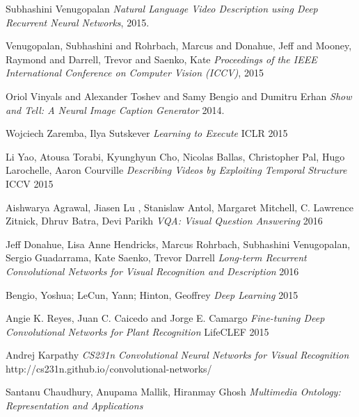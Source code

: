 \documentclass[11pt]{article}
\begin{document}
	\begin{thebibliography}{1}
	
	   Subhashini Venugopalan {\em Natural Language Video Description using Deep Recurrent Neural Networks}, 2015.
	
	    Venugopalan, Subhashini and Rohrbach, Marcus and Donahue, Jeff
                    and Mooney, Raymond and Darrell, Trevor and Saenko, Kate {\em Proceedings of the IEEE International Conference on Computer Vision (ICCV)}, 2015
	
	   Oriol Vinyals and
               Alexander Toshev and
               Samy Bengio and
               Dumitru Erhan {\em Show and Tell: {A} Neural Image Caption Generator} 2014.

         Wojciech Zaremba, Ilya Sutskever {\em Learning to Execute} ICLR 2015
         

           Li Yao, Atousa Torabi, Kyunghyun Cho, Nicolas Ballas, Christopher Pal, Hugo Larochelle, Aaron Courville {\em Describing Videos by Exploiting Temporal Structure} ICCV 2015
        

          Aishwarya Agrawal, Jiasen Lu , Stanislaw Antol,
		Margaret Mitchell, C. Lawrence Zitnick, Dhruv Batra, Devi Parikh {\em VQA: Visual Question Answering} 2016
        

          Jeff Donahue, Lisa Anne Hendricks, Marcus Rohrbach, Subhashini Venugopalan, Sergio Guadarrama, Kate Saenko, Trevor Darrell {\em Long-term Recurrent Convolutional Networks for Visual Recognition and Description} 2016

          Bengio, Yoshua; LeCun, Yann; Hinton, Geoffrey {\em Deep Learning} 2015

          Angie K. Reyes, Juan C. Caicedo and Jorge E. Camargo {\em Fine-tuning Deep Convolutional Networks for
		Plant Recognition} LifeCLEF 2015

          Andrej Karpathy {\em 
			CS231n Convolutional Neural Networks for Visual Recognition
		} http://cs231n.github.io/convolutional-networks/

		 Santanu Chaudhury, Anupama Mallik, Hiranmay Ghosh {\em Multimedia Ontology: Representation and Applications
		} 

	\end{thebibliography}
\end{document}
